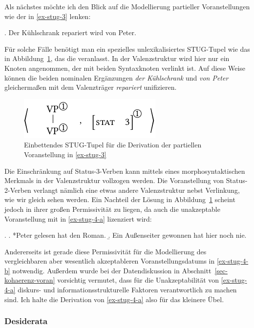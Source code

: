 Als nächstes möchte ich den Blick auf die Modellierung partieller Voranstellungen wie der in \ref{ex-stug-3} lenken: 

\ex. \label{ex-stug-3}Der Kühlschrank repariert wird von Peter.

Für solche Fälle benötigt man ein spezielles unlexikalisiertes STUG-Tupel wie das in Abbildung~\ref{fig-stug-6}, das die  veranlasst. In der Valenzstruktur wird hier nur ein Knoten angenommen, der mit beiden Syntaxknoten verlinkt ist. Auf diese Weise können die beiden nominalen Ergänzungen {\it der Kühlschrank} und {\it von Peter} gleicherma\ss en mit dem Valenzträger {\it repariert} unifizieren.
\begin{figure}[t]
\centering
\includegraphics{graphics/abb96.pdf}
\caption{\label{fig-stug-6}Einbettendes STUG-Tupel für die Derivation der partiellen Voranstellung in \ref{ex-stug-3}}
\end{figure}
Die Einschränkung auf Status-3-Verben kann mittels eines morphosyntaktischen Merkmals in der Valenzstruktur vollzogen werden. Die Voranstellung von Status-2-Verben verlangt nämlich eine etwas andere Valenzstruktur nebst Verlinkung, wie wir gleich sehen werden. Ein Nachteil der Lösung in Abbildung~\ref{fig-stug-6} scheint jedoch in ihrer gro\ss en Permissivität zu liegen, da auch die unakzeptable Voranstellung mit  in \ref{ex-stug-4-a} lizenziert wird:   

\ex. \label{ex-stug-4}
\a. *Peter gelesen hat den Roman. \hfill \citep[Abbildung~6]{Gerdes:04}\label{ex-stug-4-a}
\b. Ein Au\ss enseiter gewonnen hat hier noch nie. \hfill \citep[10-d]{Haider:90}\label{ex-stug-4-b}

Andererseits ist gerade diese Permissivität für die Modellierung des vergleichbaren aber wesentlich akzeptableren Voranstellungsdatums in \ref{ex-stug-4-b} notwendig. Au\ss erdem wurde bei der Datendiskussion in Abschnitt~\ref{sec-kohaerenz-voran} vorsichtig vermutet, dass für die Unakzeptabilität von \ref{ex-stug-4-a} diskurs- und informationsstrukturelle Faktoren verantwortlich zu machen sind. Ich halte die Derivation von \ref{ex-stug-4-a} also für das kleinere Übel.

\subsubsection*{Desiderata}

